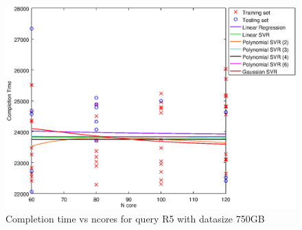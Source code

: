
\begin {figure}[hbtp]
\centering
\includegraphics[width=\textwidth]{output/R5_750_1_OVER_NCORES/plot_R5_750.eps}
\caption{Completion time vs ncores for query R5 with datasize 750GB}
\label{fig:all_nonlinear_R5_750}
\end {figure}
